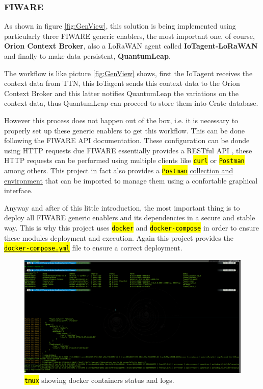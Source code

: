 \documentclass[11pt,a4paper,dvipsnames,twoside]{article}
\newcommand{\cmd}[1] {\hl{\texttt{#1}}}
\begin{document}
\subsubsection{FIWARE}\label{sssec:FIWARE}
As shown in figure \ref{fig:GenView}, this solution is being implemented using particularly three FIWARE generic enablers, the most important one, of course, \textbf{Orion Context Broker}, also a LoRaWAN agent called \textbf{IoTagent-LoRaWAN} and finally to make data persistent, \textbf{QuantumLeap}.

The workflow is like picture \ref{fig:GenView} shows, first the IoTagent receives the context data from TTN, this IoTagent sends this context data to the Orion Context Broker and this latter notifies QuantumLeap the variations on the context data, thus QuantumLeap can proceed to store them into Crate database.

However this process does not happen out of the box, i.e. it is necessary to properly set up these generic enablers to get this workflow. This can be done following the FIWARE API documentation. These configuration can be donde using HTTP requests due FIWARE essentially provides a RESTful API \cite{FIWARE_RESTful}, these HTTP requests can be performed using multiple clients like \cmd{curl} or \cmd{Postman} among others. This project in fact also provides a \href{https://github.com/WyRe/lora-arduino-dendrometer/tree/master/src/postman}{\cmd{Postman} collection and environment} that can be imported to manage them using a confortable graphical interface.

Anyway and after of this little introduction, the most important thing is to deploy all FIWARE generic enablers and its dependencies in a secure and stable way. This is why this project uses \cmd{docker} and \cmd{docker-compose} in order to ensure these modules deployment and execution. Again this project provides the \href{https://github.com/WyRe/lora-arduino-dendrometer/blob/master/src/fiware/docker-compose.yml}{\cmd{docker-compose.yml}} file to ensure a correct deployment. 

\begin{figure}[ht]
  \centering
  \includegraphics[width=.9\textwidth]{../pictures/docker_containers_deployed.png}  
  \caption{\cmd{tmux} showing docker containers status and logs.}
  \label{fig:docker_containers}
\end{figure}
\end{document}
